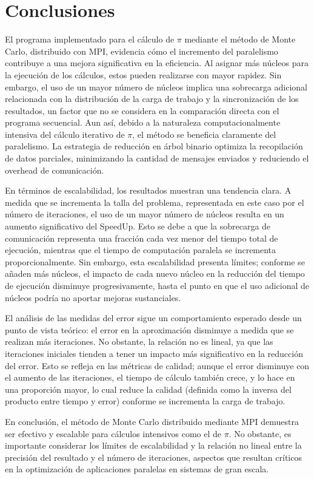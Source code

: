 \documentclass[conference, a4paper]{IEEEtran}
\begin{document}
\section{Conclusiones}
El programa implementado para el cálculo de \(\pi\) mediante el método de Monte Carlo, distribuido con MPI, evidencia cómo el incremento del paralelismo contribuye a una mejora significativa en la eficiencia. Al asignar más núcleos para la ejecución de los cálculos, estos pueden realizarse con mayor rapidez. Sin embargo, el uso de un mayor número de núcleos implica una sobrecarga adicional relacionada con la distribución de la carga de trabajo y la sincronización de los resultados, un factor que no se considera en la comparación directa con el programa secuencial. Aun así, debido a la naturaleza computacionalmente intensiva del cálculo iterativo de \(\pi\), el método se beneficia claramente del paralelismo. La estrategia de reducción en árbol binario optimiza la recopilación de datos parciales, minimizando la cantidad de mensajes enviados y reduciendo el overhead de comunicación.

En términos de escalabilidad, los resultados muestran una tendencia clara. A medida que se incrementa la talla del problema, representada en este caso por el número de iteraciones, el uso de un mayor número de núcleos resulta en un aumento significativo del SpeedUp. Esto se debe a que la sobrecarga de comunicación representa una fracción cada vez menor del tiempo total de ejecución, mientras que el tiempo de computación paralela se incrementa proporcionalmente. Sin embargo, esta escalabilidad presenta límites; conforme se añaden más núcleos, el impacto de cada nuevo núcleo en la reducción del tiempo de ejecución disminuye progresivamente, hasta el punto en que el uso adicional de núcleos podría no aportar mejoras sustanciales.

El análisis de las medidas del error sigue un comportamiento esperado desde un punto de vista teórico: el error en la aproximación disminuye a medida que se realizan más iteraciones. No obstante, la relación no es lineal, ya que las iteraciones iniciales tienden a tener un impacto más significativo en la reducción del error. Esto se refleja en las métricas de calidad; aunque el error disminuye con el aumento de las iteraciones, el tiempo de cálculo también crece, y lo hace en una proporción mayor, lo cual reduce la calidad (definida como la inversa del producto entre tiempo y error) conforme se incrementa la carga de trabajo.

En conclusión, el método de Monte Carlo distribuido mediante MPI demuestra ser efectivo y escalable para cálculos intensivos como el de \(\pi\). No obstante, es importante considerar los límites de escalabilidad y la relación no lineal entre la precisión del resultado y el número de iteraciones, aspectos que resultan críticos en la optimización de aplicaciones paralelas en sistemas de gran escala.
\end{document}
